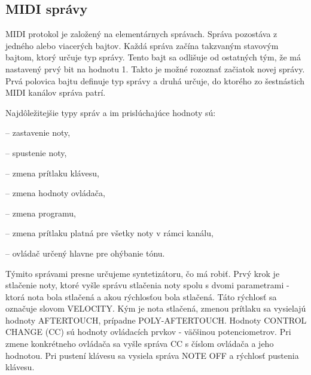 \subsection{MIDI správy}
MIDI protokol je založený na elementárnych správach. Správa pozostáva z jedného alebo viacerých bajtov. Každá správa začína takzvaným stavovým bajtom, ktorý určuje typ správy. Tento bajt sa odlišuje od ostatných tým, že má nastavený prvý bit na hodnotu 1. Takto je možné rozoznať začiatok novej správy. Prvá polovica bajtu definuje typ správy a druhá určuje, do ktorého zo šestnástich MIDI kanálov správa patrí.

Najdôležitejšie typy správ a im prislúchajúce hodnoty sú:

\begin{description}
\setlength{\itemsep}{-0.5ex}

\item[Note Off (8)] -- zastavenie noty,
\item[Note On (9)] -- spustenie noty,
\item[Polyphonic Aftertouch (A)] -- zmena prítlaku klávesu,
\item[Control Change (B)] -- zmena hodnoty ovládača,
\item[Program Change (C)] -- zmena programu,
\item[Aftertouch (D)] -- zmena prítlaku platná pre všetky noty v rámci kanálu,
\item[Pitch Wheel (E)] -- ovládač určený hlavne pre ohýbanie tónu.
\end{description}

Týmito správami presne určujeme syntetizátoru, čo má robiť. Prvý krok je stlačenie noty, ktoré vyšle správu stlačenia noty spolu s dvomi parametrami - ktorá nota bola stlačená a akou rýchlosťou bola stlačená. Táto rýchlosť sa označuje slovom VELOCITY. Kým je nota stlačená, zmenou prítlaku sa vysielajú hodnoty AFTERTOUCH, prípadne POLY-AFTERTOUCH. Hodnoty CONTROL CHANGE (CC) sú hodnoty ovládacích prvkov - väčšinou potenciometrov. Pri zmene konkrétneho ovládača sa vyšle správa CC s číslom ovládača a jeho hodnotou. Pri pustení klávesu sa vysiela správa NOTE OFF a rýchlosť pustenia klávesu.

